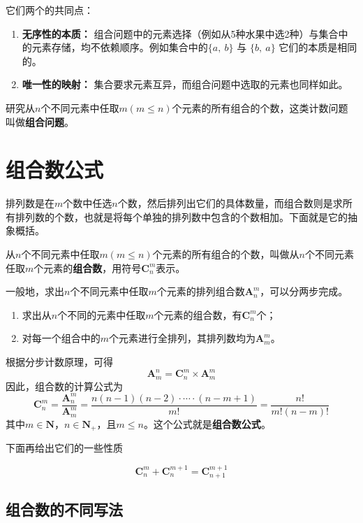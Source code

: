 它们两个的共同点：
\begin{enumerate}
    \item \textbf{无序性的本质：} 组合问题中的元素选择（例如从5种水果中选2种）与集合中的元素存储，均不依赖顺序。例如集合中的$\{ a,~b\}$ 与 $\{ b,~a\}$ 它们的本质是相同的。
    \item \textbf{唯一性的映射：} 集合要求元素互异，而组合问题中选取的元素也同样如此。
\end{enumerate}
研究从$n$个不同元素中任取$m(m \le n)$个元素的所有组合的个数，这类计数问题叫做\textbf{组合问题}。

\section{组合数公式}

排列数是在$m$个数中任选$n$个数，然后排列出它们的具体数量，而组合数则是求所有排列数的个数，也就是将每个单独的排列数中包含的个数相加。下面就是它的抽象概括。

从$n$个不同元素中任取$m(m \le n)$个元素的所有组合的个数，叫做从$n$个不同元素任取$m$个元素的\textbf{组合数}，用符号$\textbf{C}_{n}^{m}$表示。

一般地，求出$n$个不同元素中任取$m$个元素的排列组合数$\textbf{A}_{n}^m$，可以分两步完成。
\begin{enumerate}
    \item 求出从$n$个不同的元素中任取$m$个元素的组合数，有$\textbf{C}_n^{m}$个；
    \item 对每一个组合中的$m$个元素进行全排列，其排列数均为$\textbf{A}_{m}^{m}$。
\end{enumerate}
根据分步计数原理，可得
\begin{equation}
    \textbf{A}_{m}^{n} = \textbf{C}_{n}^{m} \times \textbf{A}_{m}^{m}
\end{equation}
因此，组合数的计算公式为
\begin{equation}
    \textbf{C}_{n}^{m}=\frac{\textbf{A}_{n}^{m}}{\textbf{A}_{m}^{m}}=\frac{n(n-1)(n-2)\cdot{}\cdots{}\cdot{}(n-m+1)}{m!}=\frac{n!}{m!(n-m)!}
\end{equation}
其中$m \in \mathbf{N}$，$n \in \mathbf{N}_{+}$，且$m \le n$。这个公式就是\textbf{组合数公式}。

下面再给出它们的一些性质

\begin{equation}
    \textbf{C}_{n}^{m} + \textbf{C}_{n}^{m+1} = \textbf{C}_{n+1}^{m+1}
\end{equation}

\subsection{组合数的不同写法}

